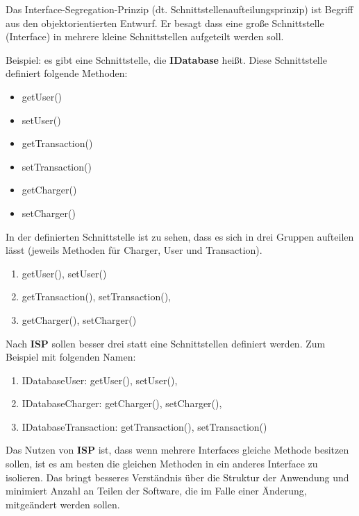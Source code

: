 Das Interface-Segregation-Prinzip (dt. Schnittstellenaufteilungsprinzip) 
ist Begriff aus den objektorientierten Entwurf. Er besagt dass eine große Schnittstelle (Interface) 
in mehrere kleine Schnittstellen aufgeteilt werden soll.

Beispiel: es gibt eine Schnittstelle, die \textbf{IDatabase} heißt. 
Diese Schnittstelle definiert folgende Methoden:
\begin{itemize}
    \item getUser()
    \item setUser()
    \item getTransaction()
    \item setTransaction()
    \item getCharger()
    \item setCharger()
\end{itemize}

In der definierten Schnittstelle ist zu sehen, 
dass es sich in drei Gruppen aufteilen lässt (jeweils Methoden für Charger, User und Transaction).
\begin{enumerate}
    \item getUser(), setUser()
    \item getTransaction(), setTransaction(),
    \item getCharger(), setCharger()
\end{enumerate}

Nach \textbf{ISP} sollen besser drei statt eine Schnittstellen definiert werden.
Zum Beispiel mit folgenden Namen:
\begin{enumerate}
    \item IDatabaseUser: getUser(), setUser(),
    \item IDatabaseCharger: getCharger(), setCharger(),
    \item IDatabaseTransaction: getTransaction(), setTransaction()
\end{enumerate}

Das Nutzen von \textbf{ISP} ist,
dass wenn mehrere Interfaces gleiche Methode besitzen sollen, 
ist es am besten die gleichen Methoden in ein anderes Interface zu isolieren.
Das bringt besseres Verständnis über die Struktur der Anwendung und 
minimiert Anzahl an Teilen der Software, 
die im Falle einer Änderung, mitgeändert werden sollen.